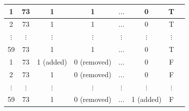 \documentclass{doublecol-new}
\theoremstyle{TH}{
\newtheorem{lemma}{Lemma}
\newtheorem{theorem}[lemma]{Theorem}
\newtheorem{corrolary}[lemma]{Corrolary}
\newtheorem{conjecture}[lemma]{Conjecture}
\newtheorem{proposition}[lemma]{Proposition}
\newtheorem{claim}[lemma]{Claim}
\newtheorem{stheorem}[lemma]{Wrong Theorem}
\newtheorem{algorithm}{Algorithm}
}
\theoremstyle{THrm}{
\newtheorem{definition}{Definition}[section]
\newtheorem{question}{Question}[section]
\newtheorem{remark}{Remark}
\newtheorem{scheme}{Scheme}
}
\theoremstyle{THhit}{
\newtheorem{case}{Case}[section]
}
\begin{document}
\begin{table}[!htb]
\begin{tabular}{|c|c|c|c|c|c|c|c|}
		1                 & 73            & 1                               & 1                               & \(\ldots\)                       & 0                                & T                \\ \hline
		2                 & 73            & 1                               & 1                               & \(\ldots\)                       & 0                                & T                \\ \hline
		\(\vdots\)        & \(\vdots\)    & \(\vdots\)                      & \(\vdots\)                      & \(\vdots\)                       & \(\vdots\)                       & \(\vdots\)       \\ \hline
		59                & 73            & 1                               & 1                               & \(\ldots\)                       & 0                                & T                \\ \hline
		1                 & 73            & 1 (added)                       & 0 (removed)                     & \(\ldots\)                       & 0                                & F                \\ \hline
		2                 & 73            & 1                               & 0 (removed)                     & \(\ldots\)                       & 0                                & F                \\ \hline
		\(\vdots\)        & \(\vdots\)    & \(\vdots\)                      & \(\vdots\)                      & \(\vdots\)                       & \(\vdots\)                       & \(\vdots\)       \\ \hline
		59                & 73            & 1                               & 0 (removed)                     & \(\ldots\)                       & 1 (added)                        & F                \\ \hline
	\end{tabular}
\end{table}
\end{document}
